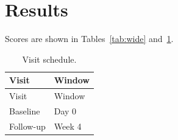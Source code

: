 \documentclass{article}
\begin{document}
\section{Results}
Scores are shown in Tables~\ref{tab:wide} and~\ref{tab:long}.
\begin{table}[t]
\caption{Scores by site.}
\label{tab:wide}
\end{table}
\begin{longtable}{@{}>{\raggedright\arraybackslash}p{4cm}l@{}}
\caption{Visit schedule.}\label{tab:long}\\
\toprule
Visit & Window \\
\midrule
\endfirsthead
\toprule
Visit & Window \\
\midrule
\endhead
Baseline & Day 0 \\
Follow-up & Week 4 \\
\bottomrule
\end{longtable}
\end{document}
